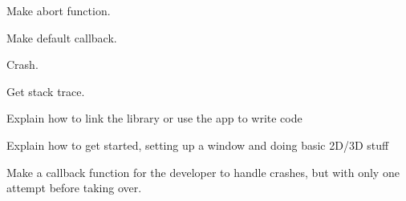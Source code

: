 
\begin{DoxyRefList}
\item[Global \mbox{\hyperlink{_crash_handler_8c_af9d107d452d67ebd418f4534ae31cab3}{n\+Crash\+Abort}} (const int32\+\_\+t error)]\label{todo__todo000001}%
%
Make abort function.  
\item[Global \mbox{\hyperlink{_errors_8c_a5575beb1cd20f6c534ab4e6342b81f2e}{error\+Callback\+Default}} (const int32\+\_\+t error, const char $\ast$error\+Desc, const int32\+\_\+t error\+Desc\+Len, const char $\ast$stack, const int32\+\_\+t stack\+Len, const time\+\_\+t error\+Time)]\label{todo__todo000002}%
%
Make default callback.  
\item[Global \mbox{\hyperlink{_errors_8c_a5c2568530315002dcbfccaafc5821883}{n\+Error\+To\+String}} (char $\ast$dst, int32\+\_\+t $\ast$size, const int32\+\_\+t error, const char $\ast$info, int32\+\_\+t info\+Len)]\label{todo__todo000003}%
%
Crash.  
\item[Global \mbox{\hyperlink{_errors_8c_a51c5b711f13bd8a6090936b7b2c21ecb}{n\+Error\+Get\+Stacktrace}} (char $\ast$dst, int32\+\_\+t $\ast$size, int32\+\_\+t $\ast$levels)]\label{todo__todo000004}%
%
Get stack trace.  
\item[page \mbox{\hyperlink{index}{Nimble Game Engine Library}} ]\label{todo__todo000005}%
%
Explain how to link the library or use the app to write code 

\label{todo__todo000006}%
%
Explain how to get started, setting up a window and doing basic 2D/3D stuff 
\item[Global \mbox{\hyperlink{_crash_handler_8h_ae1d01fa2a0db5fb774bfc0e5a3fd49c7}{n\+Crash\+Safe}} (const int32\+\_\+t error, const char $\ast$error\+Desc, int32\+\_\+t error\+Desc\+Len, const char $\ast$crash\+File\+Path, int32\+\_\+t crash\+File\+Path\+Len) \+\_\+\+\_\+attribute\+\_\+\+\_\+((noreturn))]\label{todo__todo000007}%
%
Make a callback function for the developer to handle crashes, but with only one attempt before taking over. 
\end{DoxyRefList}